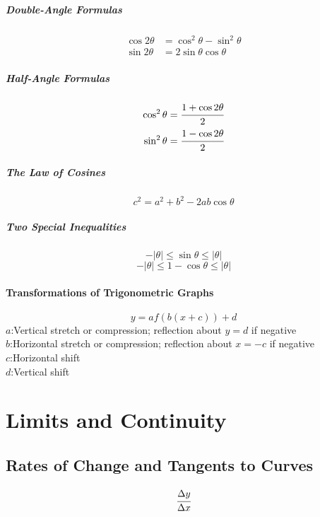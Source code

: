 \documentclass{article}
\begin{document}
            \subparagraph{Double-Angle Formulas}
            \begin{equation}
                \begin{aligned}
                    \cos 2\theta &= \cos ^2 \theta - \sin ^2 \theta\\
                    \sin 2\theta &= 2\sin \theta \cos \theta
                \end{aligned}
            \end{equation}

            \subparagraph{Half-Angle Formulas}
            \begin{equation}
                \begin{aligned}
                    \cos ^2 \theta = \cfrac{1+\cos 2\theta}{2}\\
                    \sin ^2 \theta = \cfrac{1-\cos 2\theta}{2} 
                \end{aligned}  
            \end{equation}

            \subparagraph{The Law of Cosines}
            \[c^2=a^2+b^2-2ab\cos \theta\]

            \subparagraph{Two Special Inequalities}
            \[-\lvert \theta \rvert \le \sin \theta \le \lvert \theta \rvert\]
            \[-\lvert \theta \rvert \le 1-\cos \theta \le \lvert \theta \rvert\]

            \paragraph{Transformations of Trigonometric Graphs}
            \[y=af(b(x+c))+d\]
            $a$:Vertical stretch or compression;
            reflection about $y=d$ if negative\\
            $b$:Horizontal stretch or compression;
            reflection about $x=-c$ if negative\\
            $c$:Horizontal shift\\
            $d$:Vertical shift\\

    \newpage
    \section{Limits and Continuity}
        \subsection{Rates of Change and Tangents to Curves} 
            \[\cfrac{\Delta y}{\Delta x}\]
\end{document}
